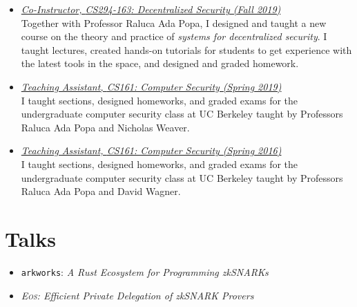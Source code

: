 \documentclass[11pt]{article}
\begin{document}
\begin{cv}{\vspace{-5em}}
\begin{itemize}[itemsep=1em]
    \item[] \href{https://inst.eecs.berkeley.edu/~cs294-163/fa19/}{\emph{Co-Instructor, {CS294-163}: Decentralized Security (Fall 2019)}}\\
      {\small
        Together with Professor Raluca Ada Popa, I designed and taught a new course on the theory and practice of \emph{systems for decentralized security}. I taught lectures, created hands-on tutorials for students to get experience with the latest tools in the space, and designed and graded homework.
      }
    \item[] \href{https://inst.eecs.berkeley.edu/~cs161/sp19/}{\emph{Teaching Assistant, {CS161}: Computer Security (Spring 2019)}}\\
      {\small
      I taught sections, designed homeworks, and graded exams for the undergraduate computer security class at UC Berkeley taught by Professors Raluca Ada Popa and Nicholas Weaver.}
    \item[] \href{https://inst.eecs.berkeley.edu/~cs161/sp16/}{\emph{Teaching Assistant, {CS161}: Computer Security (Spring 2016)}}\\
      {\small
      I taught sections, designed homeworks, and graded exams for the undergraduate computer security class at UC Berkeley taught by Professors Raluca Ada Popa and David Wagner.}
    
  \end{itemize}

  \section*{Talks}
  \begin{itemize}[itemsep=1.25em]
    \item[] \texttt{arkworks}: \emph{A Rust Ecosystem for Programming zkSNARKs} 

    \item[] \emph{\textsc{Eos}: Efficient Private Delegation of zkSNARK Provers}


\end{itemize}
\end{cv}
\end{document}
